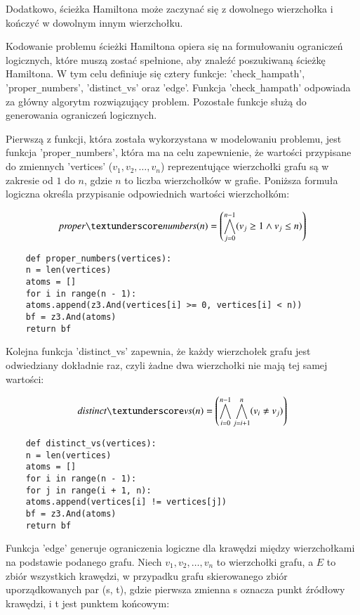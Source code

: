 Dodatkowo, ścieżka Hamiltona może zaczynać się z dowolnego wierzchołka i kończyć w dowolnym innym wierzchołku.

Kodowanie problemu ścieżki Hamiltona opiera się na formułowaniu ograniczeń logicznych, które muszą zostać spełnione, aby znaleźć poszukiwaną ścieżkę Hamiltona. W tym celu definiuje się cztery funkcje: 'check\verb|_|hampath', 'proper\verb|_|numbers', 'distinct\verb|_|vs' oraz 'edge'. Funkcja 'check\verb|_|hampath' odpowiada za główny algorytm rozwiązujący problem. Pozostałe funkcje służą do generowania ograniczeń logicznych.

Pierwszą z funkcji, która została wykorzystana w modelowaniu problemu, jest funkcja 'proper\verb|_|numbers', która ma na celu zapewnienie, że wartości przypisane do zmiennych 'vertices' ($v_1, v_2, …, v_n$) reprezentujące wierzchołki grafu są w zakresie od $1$ do $n$, gdzie $n$ to liczba wierzchołków w grafie. Poniższa formuła logiczna określa przypisanie odpowiednich wartości wierzchołkóm:

\begin{align*}
	\mli{proper\textunderscore numbers}(n) = \left( \bigwedge_{j=0}^{n-1} (v_j \geq 1 \land v_j \leq n) \right) 
\end{align*}

\begin{lstlisting}
	def proper_numbers(vertices):
	n = len(vertices)
	atoms = []
	for i in range(n - 1):
	atoms.append(z3.And(vertices[i] >= 0, vertices[i] < n))
	bf = z3.And(atoms)
	return bf
\end{lstlisting}
\vspace{1cm}

Kolejna funkcja 'distinct\verb|_|vs' zapewnia, że każdy wierzchołek grafu jest odwiedziany dokładnie raz, czyli żadne dwa wierzchołki nie mają tej samej wartości:

\begin{align*}
	\mli{distinct\textunderscore vs}(n) = \left( \bigwedge_{i=0}^{n-1} \bigwedge_{j=i+1}^{n} (v_i \neq v_j) \right)
\end{align*}

\begin{lstlisting}	
	def distinct_vs(vertices):
	n = len(vertices)
	atoms = []
	for i in range(n - 1):
	for j in range(i + 1, n):
	atoms.append(vertices[i] != vertices[j])
	bf = z3.And(atoms)
	return bf
\end{lstlisting}
\vspace{1cm}

Funkcja 'edge' generuje ograniczenia logiczne dla krawędzi między wierzchołkami na podstawie podanego grafu. Niech $v_1, v_2, …, v_n$ to wierzchołki grafu, a \(E\) to zbiór wszystkich krawędzi, w przypadku grafu skierowanego zbiór uporządkowanych par (s, t), gdzie pierwsza zmienna s oznacza punkt źródłowy krawędzi, i t jest punktem końcowym:

